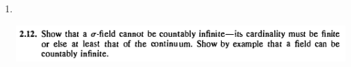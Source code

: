 \begin{enumerate}
\begin{enumerate}[label=(\alph*)]
\begin{proof}
      For inclusion in the other direction, note that for all $a, b \in \R$ with $a < b$
      \begin{align*}
        (a, b) = \bigcup_{\substack{p, q \in \Q\\a < p < q < b}} (p, q).
      \end{align*}
      Therefore $\sigma(\ms I_1) \subseteq \sigma(\ms I_2)$. But $\sigma(\ms I_1) = \sigma(\ms O)$ from lemma
      (\ref{hw3-2-11-lemma-1}) hence $\sigma(\ms O) \subseteq \sigma(\ms I_2)$.
    \end{proof}
  \item
    \begin{claim*}
      Let $\ms F$ be a class containing the countable and cocountable subsets of $\Omega$ ($A$ being
      cocountable if $A^c$ is countable). Then $\ms F$ is countably generated if and only if $\Omega$ is
      countable.
    \end{claim*}
    \begin{proof}
      Note that

      First let $\Omega$ be a countable set.
    \end{proof}
  \end{enumerate}

\newpage
\item~\\
  \begin{mdframed}
    \includegraphics[width=400pt]{img/analysis--berkeley-202a-hw-af2a.png}
  \end{mdframed}


\end{enumerate}
